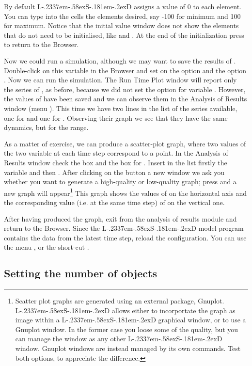\documentclass [11pt,a4paper] {book}
\def\LsD{{L\kern-.2337em\lower-.58ex\hbox{S}\kern-.181em\lower-.2ex\hbox{D}}\xspace}
\begin{document}
By default \LsD assigns a value of 0 to each element. You can type into the cells the
elements desired, say -100 for minimum and 100 for maximum. Notice that the initial value
window does not show the elements that do not need to be initialised, like  and
. At the end of the initialization press  to return to the Browser.

Now we could run a simulation, although we may want to save the results of .
Double-click on this variable in the Browser and set on the option  and the option
. Now we can run the simulation. The Run Time Plot window will report only
the series of , as before, because we did not set the option 
for variable . However, the values of  have been saved and we can observe
them in the Analysis of Results window (menu ). This time
we have two lines in the list of the series available, one for  and one for
. Observing their graph we see that they have the same dynamics, but for the
range.


As a matter of exercise, we can produce a scatter-plot graph, where two values of the two variable at each time step correspond to a point. In the Analysis of Results window check the box  and the box for . Insert in the  list firstly the variable  and then . After clicking on the button  a new window we ask you whether you want to generate a high-quality or low-quality graph; press  and a new graph will appear\footnote{Scatter plot graphs are generated using an external package, Gnuplot. \LsD allows either to incorportate the graph as image within a \LsD graphical window, or to use a Gnuplot window. In the former case you loose some of the quality, but you can manage the window as any other \LsD window. Gnuplot windows are instead managed by its own commands. Test both options, to appreciate the difference.}
This graph shows the values of  on the horizontal axis and the corresponding value
(i.e. at the same time step) of  on the vertical one. 


After having produced the graph, exit from the analysis of results module and return to the
Browser. Since the \LsD model program contains the data from the latest time step, reload
the configuration. You can use the menu , or the short-cut
.


\subsection{Setting the number of objects}
\end{document}
